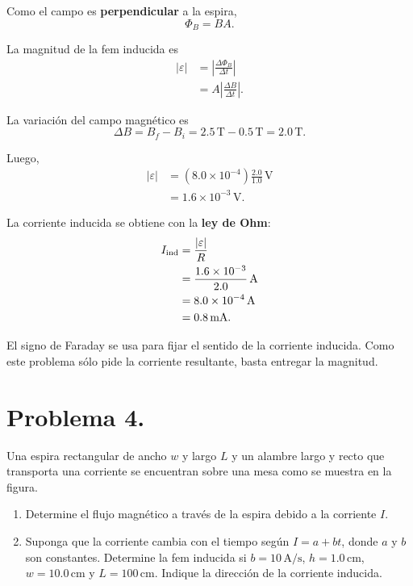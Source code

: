 \documentclass[11pt]{article}
\begin{document}
Como el campo es \textbf{perpendicular} a la espira,
\begin{equation*}
    \Phi_B=BA.
\end{equation*}

La magnitud de la fem inducida es
\begin{align*}
    |\varepsilon|
    &=\left|\frac{\Delta\Phi_B}{\Delta t}\right| \\
    &=A\left|\frac{\Delta B}{\Delta t}\right|.
\end{align*}

La variaci\'on del campo magn\'etico es
\begin{equation*}
    \Delta B=B_f-B_i=2.5\,\mathrm{T}-0.5\,\mathrm{T}=2.0\,\mathrm{T}.
\end{equation*}

Luego,
\begin{align*}
    |\varepsilon|
    &=(8.0\times10^{-4})\frac{2.0}{1.0}\,\mathrm{V} \\
    &=1.6\times10^{-3}\,\mathrm{V}.
\end{align*}

La corriente inducida se obtiene con la \textbf{ley de Ohm}:
\begin{align*}
    I_{\rm ind}
    &=\frac{|\varepsilon|}{R} \\
    &=\frac{1.6\times10^{-3}}{2.0}\,\mathrm{A} \\
    &=8.0\times10^{-4}\,\mathrm{A} \\
    &=0.8\,\mathrm{mA}.
\end{align*}


El signo de Faraday se usa para fijar el sentido de la corriente inducida. Como este problema s\'olo pide la corriente resultante, basta entregar la magnitud.


\clearpage

\section*{Problema 4.}
Una espira rectangular de ancho $w$ y largo $L$ y un alambre largo y recto que transporta una corriente se encuentran sobre una mesa como se muestra en la figura.
\begin{enumerate}[label=(\alph*)]
    \item Determine el flujo magn\'etico a trav\'es de la espira debido a la corriente $I$.
    \item Suponga que la corriente cambia con el tiempo seg\'un $I=a+bt$, donde $a$ y $b$ son constantes. Determine la fem inducida si $b=10\,\mathrm{A/s}$, $h=1.0\,\mathrm{cm}$, $w=10.0\,\mathrm{cm}$ y $L=100\,\mathrm{cm}$. Indique la direcci\'on de la corriente inducida.
\end{enumerate}
\end{document}
